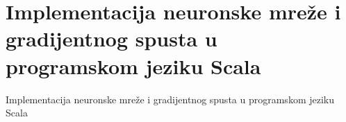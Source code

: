 \chapter{Implementacija neuronske mreže i gradijentnog spusta u programskom jeziku Scala}
\label{ch:implementacija-neuronske-mreze-i-gradijentnog-spusta-u-programskom-jeziku-scala}
Implementacija neuronske mreže i gradijentnog spusta u programskom jeziku Scala %
